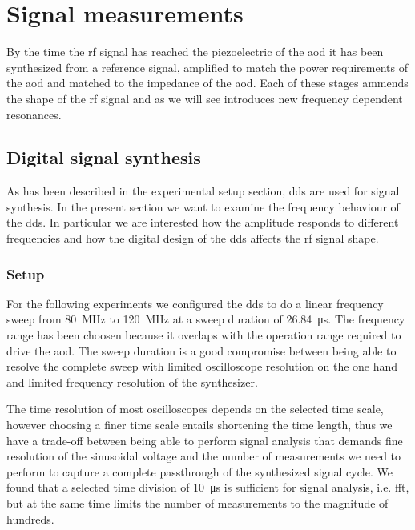 \chapter{Signal measurements}

By the time the \gls{rf} signal has reached the piezoelectric of the
\gls{aod} it has been synthesized from a reference signal, amplified to match
the power requirements of the \gls{aod} and matched to the impedance of the
\gls{aod}. Each of these stages ammends the shape of the \gls{rf} signal and
as we will see introduces new frequency dependent resonances.

\section{Digital signal synthesis}

As has been described in the experimental setup section, \gls{dds} are used
for signal synthesis. In the present section we want to examine the
frequency behaviour of the \gls{dds}. In particular we are interested how the
amplitude responds to different frequencies and how the digital design of the
\gls{dds} affects the \gls{rf} signal shape.

\subsection{Setup}

For the following experiments we configured the \gls{dds} to do a linear
frequency sweep from \SI{80}{\mega\hertz} to \SI{120}{\mega\hertz} at a sweep
duration of \SI{26.84}{\micro\second}. The frequency range has been choosen
because it overlaps with the operation range required to drive the \gls{aod}.
The sweep duration is a good compromise between being able to resolve the
complete sweep with limited oscilloscope resolution on the one hand and
limited frequency resolution of the synthesizer.

The time resolution of most oscilloscopes depends on the selected time scale,
however choosing a finer time scale entails shortening the time length, thus
we have a trade-off between being able to perform signal analysis that demands
fine resolution of the sinusoidal voltage and the number of measurements we
need to perform to capture a complete passthrough of the synthesized signal
cycle. We found that a selected time division of \SI{10}{\micro\second} is
sufficient for signal analysis, i.e. \gls{fft}, but at the same time limits
the number of measurements to the magnitude of hundreds.

